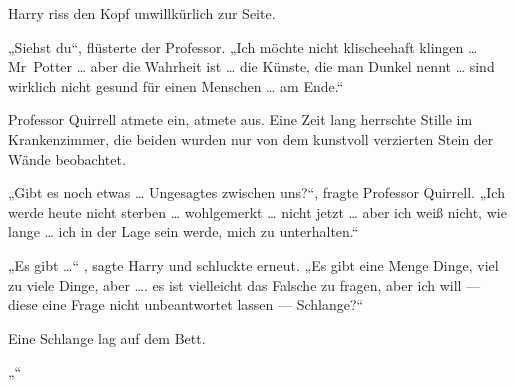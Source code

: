 Harry riss den Kopf unwillkürlich zur Seite.

„Siehst du“, flüsterte der Professor.
„Ich möchte nicht klischeehaft klingen … Mr~Potter … aber die Wahrheit ist … die Künste, die man Dunkel nennt … sind wirklich nicht gesund für einen Menschen … am Ende.“

Professor Quirrell atmete ein, atmete aus. Eine Zeit lang herrschte Stille im Krankenzimmer, die beiden wurden nur von dem kunstvoll verzierten Stein der Wände beobachtet.

„Gibt es noch etwas … Ungesagtes zwischen uns?“, fragte Professor Quirrell.
„Ich werde heute nicht sterben … wohlgemerkt … nicht jetzt … aber ich weiß nicht, wie lange … ich in der Lage sein werde, mich zu unterhalten.“

„Es gibt …“ , sagte Harry und schluckte erneut.
„Es gibt eine Menge Dinge, viel zu viele Dinge, aber …. es ist vielleicht das Falsche zu fragen, aber ich will — diese eine Frage nicht unbeantwortet lassen — Schlange?“

Eine Schlange lag auf dem Bett.

„“

